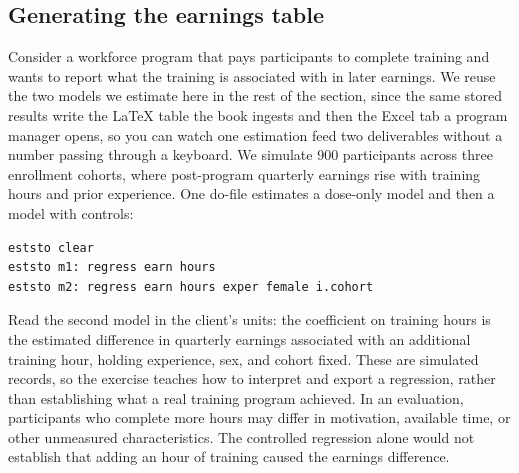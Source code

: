 \subsection{Generating the earnings table}\label{sec:ch11-worked-example}
Consider a workforce program that pays participants to complete training and wants to report what the training is associated with in later earnings. We reuse the two models we estimate here in the rest of the section, since the same stored results write the \LaTeX{} table the book ingests and then the Excel tab a program manager opens, so you can watch one estimation feed two deliverables without a number passing through a keyboard. We simulate 900 participants across three enrollment cohorts, where post-program quarterly earnings rise with training hours and prior experience. One do-file estimates a dose-only model and then a model with controls:
\par
{\footnotesize
\begin{verbatim}
eststo clear
eststo m1: regress earn hours
eststo m2: regress earn hours exper female i.cohort
\end{verbatim}
}
Read the second model in the client's units: the coefficient on training hours is the estimated difference in quarterly earnings associated with an additional training hour, holding experience, sex, and cohort fixed. These are simulated records, so the exercise teaches how to interpret and export a regression, rather than establishing what a real training program achieved. In an evaluation, participants who complete more hours may differ in motivation, available time, or other unmeasured characteristics. The controlled regression alone would not establish that adding an hour of training caused the earnings difference.


